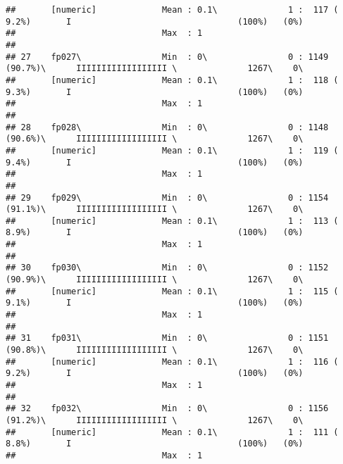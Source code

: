 \documentclass[]{article}
\begin{document}
\begin{verbatim}
##       [numeric]             Mean : 0.1\              1 :  117 ( 9.2%)       I                                 (100%)   (0%)     
##                             Max  : 1                                                                                            
## 
## 27    fp027\                Min  : 0\                0 : 1149 (90.7%)\      IIIIIIIIIIIIIIIIII \              1267\    0\       
##       [numeric]             Mean : 0.1\              1 :  118 ( 9.3%)       I                                 (100%)   (0%)     
##                             Max  : 1                                                                                            
## 
## 28    fp028\                Min  : 0\                0 : 1148 (90.6%)\      IIIIIIIIIIIIIIIIII \              1267\    0\       
##       [numeric]             Mean : 0.1\              1 :  119 ( 9.4%)       I                                 (100%)   (0%)     
##                             Max  : 1                                                                                            
## 
## 29    fp029\                Min  : 0\                0 : 1154 (91.1%)\      IIIIIIIIIIIIIIIIII \              1267\    0\       
##       [numeric]             Mean : 0.1\              1 :  113 ( 8.9%)       I                                 (100%)   (0%)     
##                             Max  : 1                                                                                            
## 
## 30    fp030\                Min  : 0\                0 : 1152 (90.9%)\      IIIIIIIIIIIIIIIIII \              1267\    0\       
##       [numeric]             Mean : 0.1\              1 :  115 ( 9.1%)       I                                 (100%)   (0%)     
##                             Max  : 1                                                                                            
## 
## 31    fp031\                Min  : 0\                0 : 1151 (90.8%)\      IIIIIIIIIIIIIIIIII \              1267\    0\       
##       [numeric]             Mean : 0.1\              1 :  116 ( 9.2%)       I                                 (100%)   (0%)     
##                             Max  : 1                                                                                            
## 
## 32    fp032\                Min  : 0\                0 : 1156 (91.2%)\      IIIIIIIIIIIIIIIIII \              1267\    0\       
##       [numeric]             Mean : 0.1\              1 :  111 ( 8.8%)       I                                 (100%)   (0%)     
##                             Max  : 1                                                                                            

\end{verbatim}
\end{document}
